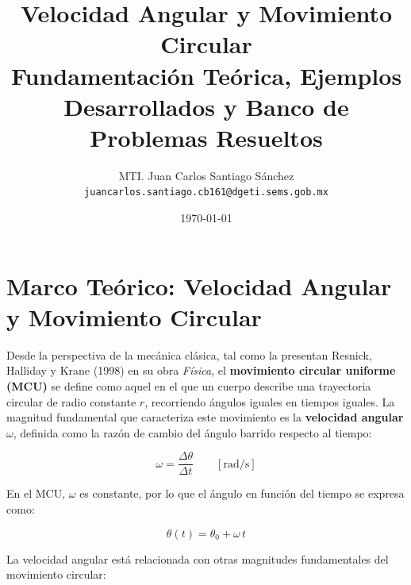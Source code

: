 \documentclass[12pt]{article}
\title{\textbf{Velocidad Angular y Movimiento Circular}\\[0.3em]
\large Fundamentación Teórica, Ejemplos Desarrollados y Banco de Problemas Resueltos}
\author{MTI. Juan Carlos Santiago Sánchez\\[0.2em]
\texttt{juancarlos.santiago.cb161@dgeti.sems.gob.mx}}
\date{\today}
\begin{document}
\maketitle
\newpage

\section*{Marco Teórico: Velocidad Angular y Movimiento Circular}

Desde la perspectiva de la mecánica clásica, tal como la presentan Resnick, Halliday y Krane (1998) en su obra \textit{Física}, el \textbf{movimiento circular uniforme (MCU)} se define como aquel en el que un cuerpo describe una trayectoria circular de radio constante \(r\), recorriendo ángulos iguales en tiempos iguales. La magnitud fundamental que caracteriza este movimiento es la \textbf{velocidad angular} \(\omega\), definida como la razón de cambio del ángulo barrido respecto al tiempo:

\[
\omega = \frac{\Delta\theta}{\Delta t} \qquad [\text{rad/s}]
\]

En el MCU, \(\omega\) es constante, por lo que el ángulo en función del tiempo se expresa como:

\[
\theta(t) = \theta_0 + \omega\,t
\]

La velocidad angular está relacionada con otras magnitudes fundamentales del movimiento circular:
\end{document}
